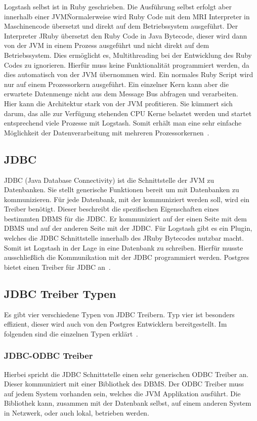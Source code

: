 Logstash selbst ist in Ruby geschrieben. Die Ausführung selbst erfolgt aber
innerhalb einer JVM\. Normalerweise wird Ruby Code mit dem \gls{MRI}
Interpreter in Maschinencode übersetzt und direkt auf dem Betriebssystem
ausgeführt. Der Interpreter JRuby übersetzt den Ruby Code in Java Bytecode,
dieser wird dann von der JVM in einem Prozess ausgeführt und nicht direkt auf
dem Betriebssystem. Dies ermöglicht es, Multithreading bei der Entwicklung des
Ruby Codes zu ignorieren. Hierfür muss keine Funktionalität programmiert
werden, da dies automatisch von der JVM übernommen wird. Ein normales Ruby
Script wird nur auf einem Prozessorkern ausgeführt. Ein einzelner Kern kann
aber die erwartete Datenmenge nicht aus dem Message Bus abfragen und
verarbeiten. Hier kann die Architektur stark von der JVM profitieren. Sie
kümmert sich darum, das alle zur Verfügung stehenden CPU Kerne belastet werden
und startet entsprechend viele Prozesse mit Logstash. Somit erhält man eine
sehr einfache Möglichkeit der Datenverarbeitung mit mehreren
Prozessorkernen~\cite{jruby}.
\tm%

\subsection{JDBC}
\gls{JDBC} (Java Database Connectivity) ist die Schnittstelle der JVM zu
Datenbanken. Sie stellt generische Funktionen bereit um mit Datenbanken zu
kommunizieren. Für jede Datenbank, mit der kommuniziert werden soll, wird ein
Treiber benötigt. Dieser beschreibt die spezifischen Eigenschaften eines
bestimmten \gls{DBMS} für die JDBC\@. Er kommuniziert auf der einen Seite mit
dem DBMS und auf der anderen Seite mit der JDBC\@. Für Logstash gibt es ein
Plugin, welches die JDBC Schnittstelle innerhalb des JRuby Bytecodes nutzbar
macht.  Somit ist Logstash in der Lage in eine Datenbank zu schreiben. Hierfür
musste ausschließlich die Kommunikation mit der JDBC programmiert werden.
Postgres bietet einen Treiber für JDBC an~\cite{postgres-jdbc}.
\tm%

\subsection{JDBC Treiber Typen}
Es gibt vier verschiedene Typen von JDBC Treibern. Typ vier ist besonders
effizient, dieser wird auch von den Postgres Entwicklern bereitgestellt. Im
folgenden sind die einzelnen Typen erklärt~\cite{jdbc-types}.

\subsubsection{JDBC-ODBC Treiber}
Hierbei spricht die JDBC Schnittstelle einen sehr generischen \gls{ODBC}
Treiber an. Dieser kommuniziert mit einer Bibliothek des DBMS\@. Der ODBC
Treiber muss auf jedem System vorhanden sein, welches die JVM Applikation
ausführt. Die Bibliothek kann, zusammen mit der Datenbank selbst, auf einem
anderen System in Netzwerk, oder auch lokal, betrieben werden.

